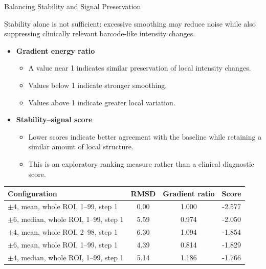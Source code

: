\documentclass[aspectratio=169]{beamer}
\begin{document}
\begin{frame}{Balancing Stability and Signal Preservation}

\small

Stability alone is not sufficient: excessive smoothing may reduce noise while
also suppressing clinically relevant barcode-like intensity changes.

\begin{itemize}
    \item \textbf{Gradient energy ratio}
    \begin{itemize}
        \item A value near 1 indicates similar preservation of local intensity
        changes.
        \item Values below 1 indicate stronger smoothing.
        \item Values above 1 indicate greater local variation.
    \end{itemize}

    \item \textbf{Stability--signal score}
    \begin{itemize}
        \item Lower scores indicate better agreement with the baseline while
        retaining a similar amount of local structure.
        \item This is an exploratory ranking measure rather than a clinical
        diagnostic score.
    \end{itemize}
\end{itemize}

\begin{table}
\centering
\scriptsize
\begin{tabular}{lccc}
\toprule
Configuration & RMSD & Gradient ratio & Score\\
\midrule
$\pm4$, mean, whole ROI, 1--99, step 1 & 0.00 & 1.000 & -2.577\\
$\pm6$, median, whole ROI, 1--99, step 1 & 5.59 & 0.974 & -2.050\\
$\pm4$, mean, whole ROI, 2--98, step 1 & 6.30 & 1.094 & -1.854\\
$\pm6$, mean, whole ROI, 1--99, step 1 & 4.39 & 0.814 & -1.829\\
$\pm4$, median, whole ROI, 1--99, step 1 & 5.14 & 1.186 & -1.766\\
\bottomrule
\end{tabular}
\end{table}

\end{frame}
\end{document}
